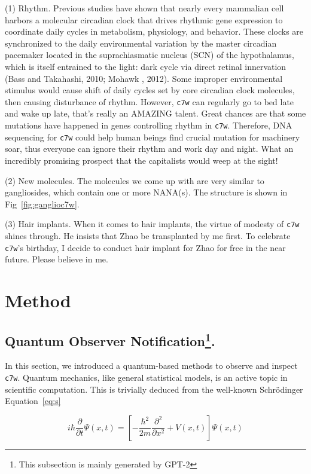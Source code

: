 \documentclass[10pt,twocolumn,letterpaper]{article}
\begin{document}
(1) Rhythm. Previous studies have shown that nearly every mammalian cell harbors a molecular circadian clock that drives rhythmic gene expression to coordinate daily cycles in metabolism, physiology, and behavior. These clocks are synchronized to the daily environmental variation by the master circadian pacemaker located in the suprachiasmatic nucleus (SCN) of the hypothalamus, which is itself entrained to the light: dark cycle via direct retinal innervation (Bass and Takahashi, 2010; Mohawk \etal, 2012). Some improper environmental stimulus would cause shift of daily cycles set by core circadian clock molecules, then causing disturbance of rhythm. However, \verb|c7w| can regularly go to bed late and wake up late, that's really an AMAZING talent. Great chances are that some mutations have happened in genes controlling rhythm in \verb|c7w|. Therefore, DNA sequencing for \verb|c7w| could help human beings find crucial mutation for machinery soar, thus everyone can ignore their rhythm and work day and night. What an incredibly promising prospect that the capitalists would weep at the sight!

(2) New molecules. The molecules we come up with are very similar to gangliosides, which contain one or more NANA(s). The structure is shown in Fig~\ref{fig:ganglioc7w}.


(3) Hair implants. When it comes to hair implants, the virtue of modesty of \verb|c7w| shines through. He insists that Zhao be transplanted by me first. To celebrate \verb|c7w|'s birthday, I decide to conduct hair implant for Zhao for free in the near future. Please believe in me.


\section{Method}

\subsection{Quantum Observer Notification\protect\footnote{This subsection is mainly generated by GPT-2}.}

In this section, we introduced a quantum-based methods to observe and inspect \verb|c7w|. Quantum mechanics, like general statistical models, is an active topic in scientific computation. This is trivially deduced from the well-known Schrödinger Equation~\ref{eq:s}

\begin{equation}
\label{eq:s}
    \displaystyle i\hbar {\frac {\partial }{\partial t}}\Psi (x,t)=\left[-{\frac {\hbar ^{2}}{2m}}{\frac {\partial ^{2}}{\partial x^{2}}}+V(x,t)\right]\Psi (x,t)
\end{equation}
\end{document}
